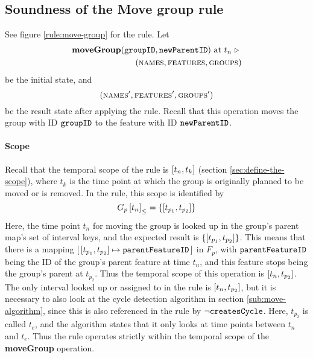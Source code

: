 
\subsection{Soundness of the Move group rule}
\label{sub:soundness-of-the-move-group-rule}

See figure \vref{rule:move-group} for the  rule. Let 
\begin{equation*}
   \begin{split}
      \textbf{moveGroup}(\texttt{groupID}, \texttt{newParentID}) \text{ at } t_n \ \triangleright \  \\
      (\textsc{names}, \textsc{features}, \textsc{groups}{})
   \end{split}
\end{equation*}
be the initial state, and
\[
   (\textsc{names}', \textsc{features}', \textsc{groups}{}')
\]
be the result state after applying the  rule. Recall that this operation moves the group with ID $\texttt{groupID}$ to the feature with ID $\texttt{newParentID}$.

\paragraph{Scope}
Recall that the temporal scope of the  rule is $\interval{t_n}{t_k}$ (section \vref{sec:define-the-scope}), where $t_k$ is the time point at which the group is originally planned to be moved or is removed. In the rule, this scope is identified by 
   \[
      \containing{G_p}{t_n} = \set{\interval{t_{p_1}}{t_{p_2}}}
   \]
   Here, the time point $t_n$ for moving the group is looked up in the group's parent map's set of interval keys, and the expected result is $\set{\interval{t_{p_1}}{t_{p_2}}}$. This means that there is a mapping $\intervalmapping{t_{p_1}}{t_{p_2}}{\var{parentFeatureID}}$ in $F_p$, with $\texttt{parentFeatureID}$ being the ID of the group's parent feature at time $t_n$, and this feature stops being the group's parent at $t_{p_2}$. Thus the temporal scope of this operation is $\interval{t_n}{t_{p_2}}$. The only interval looked up or assigned to in the rule is $\interval{t_n}{t_{p_2}}$, but it is necessary to also look at the cycle detection algorithm in section \vref{sub:move-algorithm}, since this is also referenced in the rule by $\neg \texttt{createsCycle}$. Here, $t_{p_2}$ is called $t_e$, and the algorithm states that it only looks at time points between $t_n$ and $t_e$. Thus the rule operates strictly within the temporal scope of the \textbf{moveGroup} operation.

